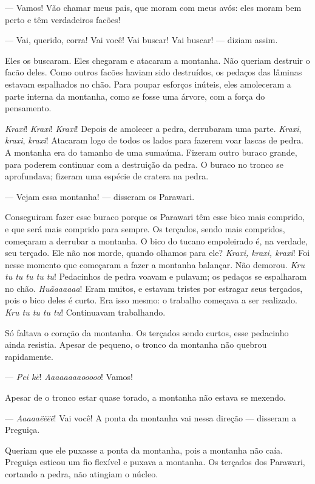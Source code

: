 --- Vamos! Vão chamar meus pais, que moram com meus avós: eles moram bem
perto e têm verdadeiros facões! 

--- Vai, querido, corra! Vai você! Vai buscar! Vai buscar! --- diziam
assim. 

Eles os buscaram. Eles chegaram e atacaram a montanha. Não queriam
destruir o facão deles. Como outros facões haviam sido destruídos, os
pedaços das lâminas estavam espalhados no chão. Para poupar esforços
inúteis, eles amoleceram a parte interna da montanha, como se fosse uma
árvore, com a força do pensamento. 

\textit{Kraxi}! \textit{Kraxi}! \textit{Kraxi}! Depois de amolecer a pedra, derrubaram uma
parte. \textit{Kraxi}, \textit{kraxi}, \textit{kraxi}! Atacaram logo de todos os lados para
fazerem voar lascas de pedra. A montanha era do tamanho de uma sumaúma.
Fizeram outro buraco grande, para poderem continuar com a destruição da
pedra. O buraco no tronco se aprofundava; fizeram uma espécie de cratera
na pedra. 

--- Vejam essa montanha! --- disseram os Parawari. 

Conseguiram fazer esse buraco porque os Parawari têm esse bico mais
comprido, e que será mais comprido para sempre. Os terçados, sendo
mais compridos, começaram a derrubar a montanha. O bico do tucano
empoleirado é, na verdade, seu terçado. Ele não nos morde, quando olhamos
para ele? \textit{Kraxi, kraxi, kraxi}! Foi nesse momento que começaram a
fazer a montanha balançar. Não demorou. \textit{Kru tu tu tu tu tu}!
Pedacinhos de pedra voavam e pulavam; os pedaços se espalharam no
chão. \textit{Huãaaaaaa}! Eram muitos, e estavam tristes por estragar seus
terçados, pois o bico deles é curto. Era isso mesmo: o trabalho começava
a ser realizado. \textit{Kru tu tu tu tu}! Continuavam trabalhando.

Só faltava o coração da montanha. Os terçados sendo curtos, esse
pedacinho ainda resistia. Apesar de pequeno, o tronco da montanha não
quebrou rapidamente.

--- \textit{Pei kë}! \textit{Aaaaaaaaooooo}! Vamos! 

Apesar de o tronco estar quase torado, a montanha não estava se
mexendo. 

--- \textit{Aaaaaëëëë}! Vai você! A ponta da montanha vai nessa direção
--- disseram a Preguiça. 

Queriam que ele puxasse a ponta da montanha, pois a montanha não caía.
Preguiça esticou um fio flexível e puxava a montanha. Os terçados dos
Parawari, cortando a pedra, não atingiam o núcleo. 

